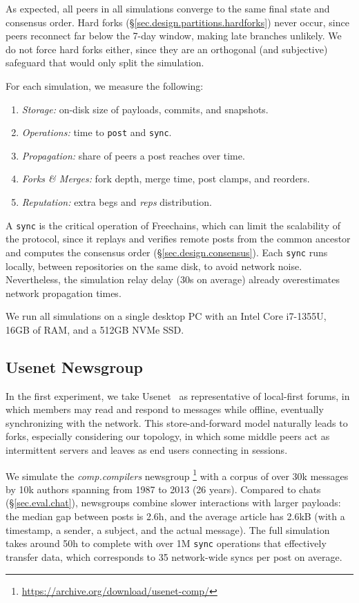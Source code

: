 \documentclass[10pt,twocolumn]{article}
\newcommand{\FC}       {Freechains\xspace}
\newcommand{\reps}     {\emph{reps}\xspace}
\newcommand{\code}[1]  {\texttt{\small{#1}}}
\begin{document}
As expected, all peers in all simulations converge to the same final state and
consensus order.
%
Hard forks (\S\ref{sec.design.partitions.hardforks}) never occur, since peers
reconnect far below the 7-day window, making late branches unlikely.
We do not force hard forks either, since they are an orthogonal (and
subjective) safeguard that would only split the simulation.

For each simulation, we measure the following:
%
\begin{enumerate}
\item \emph{Storage:} on-disk size of payloads, commits, and snapshots.
\item \emph{Operations:} time to \code{post} and \code{sync}.
\item \emph{Propagation:} share of peers a post reaches over time.
\item \emph{Forks \& Merges:} fork depth, merge time, post clamps, and reorders.
\item \emph{Reputation:} extra begs and \reps distribution.
\end{enumerate}

A \code{sync} is the critical operation of \FC, which can limit the scalability
of the protocol, since it replays and verifies remote posts from the common
ancestor and computes the consensus order (\S\ref{sec.design.consensus}).
%
Each \code{sync} runs locally, between repositories on the same disk, to avoid
network noise.
Nevertheless, the simulation relay delay (30s on average) already overestimates
network propagation times.

We run all simulations on a single desktop PC with an Intel Core i7-1355U, 16GB
of RAM, and a 512GB NVMe SSD.

\subsection{Usenet Newsgroup}
\label{sec.eval.usenet}

In the first experiment, we take Usenet~\cite{fed.usenet} as representative of
local-first forums, in which members may read and respond to messages while
offline, eventually synchronizing with the network.
%
This store-and-forward model naturally leads to forks, especially considering
our topology, in which some middle peers act as intermittent servers and leaves
as end users connecting in sessions.

We simulate the \emph{comp.compilers} newsgroup%
\footnote{ \url{https://archive.org/download/usenet-comp/} }
with a corpus of over 30k messages by 10k authors spanning from 1987 to 2013
(26 years).
%
Compared to chats (\S\ref{sec.eval.chat}), newsgroups combine slower
interactions with larger payloads: the median gap between posts is 2.6h, and
the average article has 2.6kB (with a timestamp, a sender, a subject, and the
actual message).
%
The full simulation takes around 50h to complete with over 1M \code{sync}
operations that effectively transfer data, which corresponds to 35
network-wide syncs per post on average.
\end{document}
